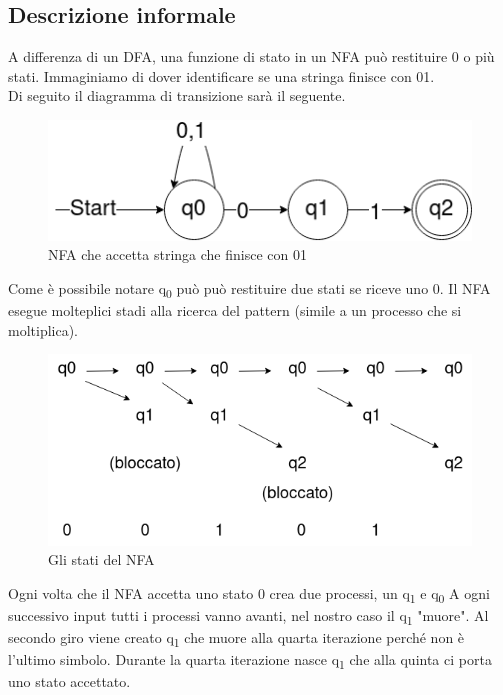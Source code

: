 \documentclass[12pt]{article}
\begin{document}
\newpage
\subsection{Descrizione informale}
A differenza di un DFA, una funzione di stato in un NFA può restituire 0 o più stati. Immaginiamo di dover identificare se una stringa finisce con 01. 
\\ Di seguito il diagramma di transizione sarà il seguente.
\begin{figure}[h]
\includegraphics[scale = 0.5]{media/01_end.png}
\centering
\caption{NFA che accetta stringa che finisce con 01}
\end{figure}
Come è possibile notare q\textsubscript{0} può può restituire due stati se riceve uno 0. Il NFA esegue molteplici stadi alla ricerca del pattern (simile a un processo che si moltiplica). 

\begin{figure}[h]
\includegraphics[scale = 0.5]{media/NFA_es.png}
\centering
\caption{Gli stati del NFA}
\end{figure}
Ogni volta che il NFA accetta uno stato 0 crea due processi, un q\textsubscript{1} e q\textsubscript{0}
A ogni successivo input tutti i processi vanno avanti, nel nostro caso il q\textsubscript{1} "muore". Al secondo giro viene creato q\textsubscript{1} che muore alla quarta iterazione perché non è l'ultimo simbolo. Durante la quarta iterazione nasce q\textsubscript{1} che alla quinta ci porta uno stato accettato.

\newpage
\end{document}

